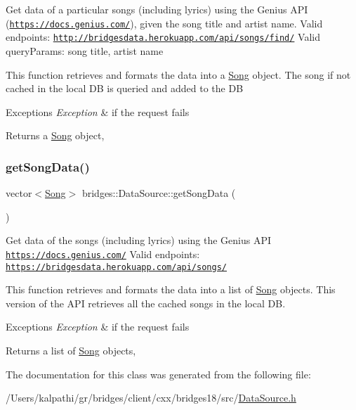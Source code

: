 Get data of a particular songs (including lyrics) using the Genius A\+PI (\href{https://docs.genius.com/}{\tt https\+://docs.\+genius.\+com/}), given the song title and artist name. Valid endpoints\+: \href{http://bridgesdata.herokuapp.com/api/songs/find/}{\tt http\+://bridgesdata.\+herokuapp.\+com/api/songs/find/} Valid query\+Params\+: song title, artist name

This function retrieves and formats the data into a \mbox{\hyperlink{classbridges_1_1_song}{Song}} object. The song if not cached in the local DB is queried and added to the DB


\begin{DoxyExceptions}{Exceptions}
{\em Exception} & if the request fails\\
\hline
\end{DoxyExceptions}
\begin{DoxyReturn}{Returns}
a \mbox{\hyperlink{classbridges_1_1_song}{Song}} object, 
\end{DoxyReturn}
\mbox{\label{classbridges_1_1_data_source_a5e8d035a1becf96c71569e0966e93849}} 
\subsubsection{\texorpdfstring{get\+Song\+Data()}{getSongData()}}
{\footnotesize\ttfamily vector$<$\mbox{\hyperlink{classbridges_1_1_song}{Song}}$>$ bridges\+::\+Data\+Source\+::get\+Song\+Data (\begin{DoxyParamCaption}{ }\end{DoxyParamCaption})\hspace{0.3cm}{\ttfamily [inline]}}

Get data of the songs (including lyrics) using the Genius A\+PI \href{https://docs.genius.com/}{\tt https\+://docs.\+genius.\+com/} Valid endpoints\+: \href{https://bridgesdata.herokuapp.com/api/songs/}{\tt https\+://bridgesdata.\+herokuapp.\+com/api/songs/}

This function retrieves and formats the data into a list of \mbox{\hyperlink{classbridges_1_1_song}{Song}} objects. This version of the A\+PI retrieves all the cached songs in the local DB.


\begin{DoxyExceptions}{Exceptions}
{\em Exception} & if the request fails\\
\hline
\end{DoxyExceptions}
\begin{DoxyReturn}{Returns}
a list of \mbox{\hyperlink{classbridges_1_1_song}{Song}} objects, 
\end{DoxyReturn}


The documentation for this class was generated from the following file\+:\begin{DoxyCompactItemize}
\item 
/\+Users/kalpathi/gr/bridges/client/cxx/bridges18/src/\mbox{\hyperlink{_data_source_8h}{Data\+Source.\+h}}\end{DoxyCompactItemize}
